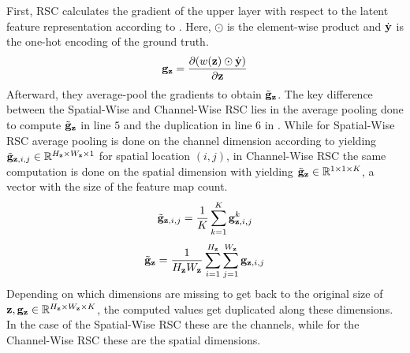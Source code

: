 First, RSC calculates the gradient of the upper layer with respect to the latent feature representation according to . Here, $\odot$ is the element-wise product and $\dot{\mathbf{y}}$ is the one-hot encoding of the ground truth.
\begin{equation}
    \mathbf{g}_\mathbf{z} = \frac{\partial( w (\mathbf{z}) \odot \dot{\mathbf{y}})}{\partial \mathbf{z}}
    \label{eq:gz}
\end{equation}
Afterward, they average-pool the gradients to obtain $\Tilde{\mathbf{g}}_\mathbf{z}$. The key difference between the Spatial-Wise and Channel-Wise RSC lies in the average pooling done to compute $\Tilde{\mathbf{g}}_\mathbf{z}$ in line $5$ and the duplication in line $6$ in . While for Spatial-Wise RSC average pooling is done on the channel dimension according to  yielding $\Tilde{\mathbf{g}}_{\mathbf{z}, i, j} \in \mathbb{R}^{H_{\mathbf{z}} \times W_{\mathbf{z}} \times 1}$ for spatial location $(i,j)$, in Channel-Wise RSC the same computation is done on the spatial dimension with  yielding $\Tilde{\mathbf{g}}_\mathbf{z} \in \mathbb{R}^{1 \times 1 \times K}$, a vector with the size of the feature map count.
\begin{equation}
\label{eq:SpatialRSCavg}
     \Tilde{\mathbf{g}}_{\mathbf{z}, i, j} = \frac{1}{K} \sum_{k=1}^K \mathbf{g}_{\mathbf{z},i,j}^k
\end{equation}
\begin{equation}
\label{eq:ChannelRSCavg}
     \Tilde{\mathbf{g}}_\mathbf{z} = \frac{1}{H_\mathbf{z}W_\mathbf{z}} \sum_{i=1}^{H_\mathbf{z}} \sum_{j=1}^{W_\mathbf{z}} \mathbf{g}_{\mathbf{z},i,j}
\end{equation}
Depending on which dimensions are missing to get back to the original size of $\mathbf{z}, \mathbf{g}_\mathbf{z} \in \mathbb{R}^{H_\mathbf{z} \times W_\mathbf{z} \times K}$, the computed values get duplicated along these dimensions. In the case of the Spatial-Wise RSC these are the channels, while for the Channel-Wise RSC these are the spatial dimensions. 

